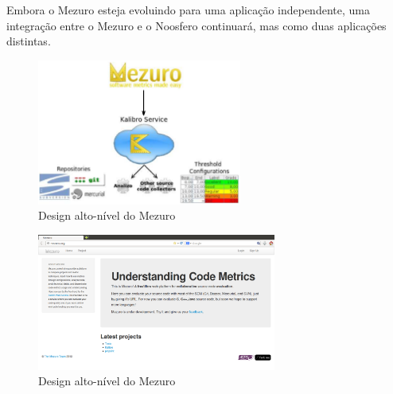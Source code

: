Embora o Mezuro esteja evoluindo para uma aplicação independente, uma integração entre o Mezuro e o Noosfero continuará, mas como duas aplicações distintas.

\graphicspath{{figuras/}}
\begin{figure}[H]
\centering
\includegraphics[width=0.6\textwidth]{mezuro-standalone-design}
\caption{Design alto-nível do Mezuro}
\label{mvc}
\end{figure}
  



\graphicspath{{figuras/}}
\begin{figure}[H]
\centering
\includegraphics[width=0.7\textwidth]{mezuro-standalone}
\caption{Design alto-nível do Mezuro}
\label{mvc}
\end{figure}



